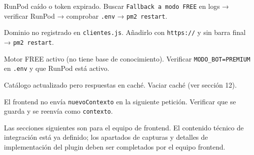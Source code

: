 \documentclass[12pt, a4paper]{article}
\begin{document}
\begin{tcolorbox}[colback=rojoclaro!50, colframe=rojooscuro, fontupper=\small,
                  title={\bfseries El bot responde en modo FREE (respuestas genéricas)}]
RunPod caído o token expirado. Buscar \texttt{Fallback a modo FREE} en logs → verificar RunPod → comprobar \texttt{.env} → \texttt{pm2 restart}.
\end{tcolorbox}

\begin{tcolorbox}[colback=rojoclaro!50, colframe=rojooscuro, fontupper=\small,
                  title={\bfseries El chat no responde (error CORS en consola del navegador)}]
Dominio no registrado en \texttt{clientes.js}. Añadirlo con \texttt{https://} y sin barra final → \texttt{pm2 restart}.
\end{tcolorbox}

\begin{tcolorbox}[colback=rojoclaro!50, colframe=rojooscuro, fontupper=\small,
                  title={\bfseries El bot busca piezas ante preguntas comerciales}]
Motor FREE activo (no tiene base de conocimiento). Verificar \texttt{MODO\_BOT=PREMIUM} en \texttt{.env} y que RunPod está activo.
\end{tcolorbox}

\begin{tcolorbox}[colback=rojoclaro!50, colframe=rojooscuro, fontupper=\small,
                  title={\bfseries Los resultados de búsqueda están desactualizados}]
Catálogo actualizado pero respuestas en caché. Vaciar caché (ver sección 12).
\end{tcolorbox}

\begin{tcolorbox}[colback=rojoclaro!50, colframe=rojooscuro, fontupper=\small,
                  title={\bfseries El bot pide datos que el usuario ya dio}]
El frontend no envía \texttt{nuevoContexto} en la siguiente petición. Verificar que se guarda y se reenvía como \texttt{contexto}.
\end{tcolorbox}


\newpage
\begin{tcolorbox}[colback=moradoclaro, colframe=moradooscuro, fontupper=\normalsize\bfseries,
                  title={\large\bfseries\color{moradooscuro} A partir de aquí: sección del equipo Frontend}]
Las secciones siguientes son para el equipo de frontend. El contenido técnico de integración
está ya definido; los apartados de capturas y detalles de implementación del plugin
deben ser completados por el equipo frontend.
\end{tcolorbox}
\end{document}
